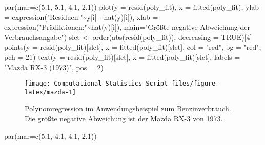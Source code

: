 \documentclass[
  ngerman,
]{book}
\newenvironment{Shaded}{\begin{snugshade}}{\end{snugshade}}
\newcommand{\AttributeTok}[1]{\textcolor[rgb]{0.77,0.63,0.00}{#1}}
\newcommand{\ConstantTok}[1]{\textcolor[rgb]{0.00,0.00,0.00}{#1}}
\newcommand{\DecValTok}[1]{\textcolor[rgb]{0.00,0.00,0.81}{#1}}
\newcommand{\FloatTok}[1]{\textcolor[rgb]{0.00,0.00,0.81}{#1}}
\newcommand{\FunctionTok}[1]{\textcolor[rgb]{0.00,0.00,0.00}{#1}}
\newcommand{\NormalTok}[1]{#1}
\newcommand{\OtherTok}[1]{\textcolor[rgb]{0.56,0.35,0.01}{#1}}
\newcommand{\SpecialCharTok}[1]{\textcolor[rgb]{0.00,0.00,0.00}{#1}}
\newcommand{\StringTok}[1]{\textcolor[rgb]{0.31,0.60,0.02}{#1}}
\begin{document}
\begin{Shaded}
\begin{Highlighting}[]
\FunctionTok{par}\NormalTok{(}\AttributeTok{mar=}\FunctionTok{c}\NormalTok{(}\FloatTok{5.1}\NormalTok{, }\FloatTok{5.1}\NormalTok{, }\FloatTok{4.1}\NormalTok{, }\FloatTok{2.1}\NormalTok{))}
\FunctionTok{plot}\NormalTok{(}\AttributeTok{y =} \FunctionTok{resid}\NormalTok{(poly\_fit), }\AttributeTok{x =} \FunctionTok{fitted}\NormalTok{(poly\_fit), }
     \AttributeTok{ylab =} \FunctionTok{expression}\NormalTok{(}\StringTok{"Residuen:"}\SpecialCharTok{\textasciitilde{}}\NormalTok{y[i] }\SpecialCharTok{{-}} \FunctionTok{hat}\NormalTok{(y)[i]), }
     \AttributeTok{xlab =} \FunctionTok{expression}\NormalTok{(}\StringTok{"Prädiktionen:"}\SpecialCharTok{\textasciitilde{}}\FunctionTok{hat}\NormalTok{(y)[i]),}
     \AttributeTok{main=}\StringTok{"Größte negative Abweichung der Verbrauchsangabe"}\NormalTok{)}
\NormalTok{slct }\OtherTok{\textless{}{-}} \FunctionTok{order}\NormalTok{(}\FunctionTok{abs}\NormalTok{(}\FunctionTok{resid}\NormalTok{(poly\_fit)), }\AttributeTok{decreasing =} \ConstantTok{TRUE}\NormalTok{)[}\DecValTok{4}\NormalTok{]}
\FunctionTok{points}\NormalTok{(}\AttributeTok{y =} \FunctionTok{resid}\NormalTok{(poly\_fit)[slct], }\AttributeTok{x =} \FunctionTok{fitted}\NormalTok{(poly\_fit)[slct], }
       \AttributeTok{col =} \StringTok{"red"}\NormalTok{, }\AttributeTok{bg =} \StringTok{"red"}\NormalTok{, }\AttributeTok{pch =} \DecValTok{21}\NormalTok{)}
\FunctionTok{text}\NormalTok{(}\AttributeTok{y =} \FunctionTok{resid}\NormalTok{(poly\_fit)[slct], }\AttributeTok{x =} \FunctionTok{fitted}\NormalTok{(poly\_fit)[slct], }
     \AttributeTok{labels =} \StringTok{"Mazda RX{-}3 (1973)"}\NormalTok{, }\AttributeTok{pos =} \DecValTok{2}\NormalTok{)}
\end{Highlighting}
\end{Shaded}

\begin{figure}[h]

{\centering \texttt{[image: Computational\_Statistics\_Script\_files/figure-latex/mazda-1]} 

}

\caption{Polynomregression im Anwendungsbeispiel zum Benzinverbrauch. Die größte negative Abweichung ist der Mazda RX-3 von 1973.}\label{fig:mazda}
\end{figure}

\begin{Shaded}
\begin{Highlighting}[]
\FunctionTok{par}\NormalTok{(}\AttributeTok{mar=}\FunctionTok{c}\NormalTok{(}\FloatTok{5.1}\NormalTok{, }\FloatTok{4.1}\NormalTok{, }\FloatTok{4.1}\NormalTok{, }\FloatTok{2.1}\NormalTok{))}
\end{Highlighting}
\end{Shaded}
\end{document}
